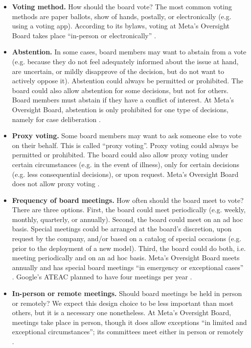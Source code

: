 \documentclass{article}
\begin{document}
\begin{itemize}[leftmargin=2em]
    \item \textbf{Voting method.} How should the board vote? The most common voting methods are paper ballots, show of hands, postally, or electronically (e.g. using a voting app). According to its bylaws, voting at Meta’s Oversight Board takes place “in-person or electronically” \cite{oversight2022bylaws}.
    \item \textbf{Abstention.} In some cases, board members may want to abstain from a vote (e.g. because they do not feel adequately informed about the issue at hand, are uncertain, or mildly disapprove of the decision, but do not want to actively oppose it). Abstention could always be permitted or prohibited. The board could also allow abstention for some decisions, but not for others. Board members must abstain if they have a conflict of interest. At Meta’s Oversight Board, abstention is only prohibited for one type of decisions, namely for case deliberation \cite{oversight2022bylaws}.
    \item \textbf{Proxy voting.} Some board members may want to ask someone else to vote on their behalf. This is called “proxy voting”. Proxy voting could always be permitted or prohibited. The board could also allow proxy voting under certain circumstances (e.g. in the event of illness), only for certain decisions (e.g. less consequential decisions), or upon request. Meta’s Oversight Board does not allow proxy voting \cite{oversight2022bylaws}.
    \item \textbf{Frequency of board meetings.} How often should the board meet to vote? There are three options. First, the board could meet periodically (e.g. weekly, monthly, quarterly, or annually). Second, the board could meet on an ad hoc basis. Special meetings could be arranged at the board’s discretion, upon request by the company, and/or based on a catalog of special occasions (e.g. prior to the deployment of a new model). Third, the board could do both, i.e. meeting periodically and on an ad hoc basis. Meta’s Oversight Board meets annually and has special board meetings “in emergency or exceptional cases” \cite{oversight2022bylaws}. Google’s ATEAC planned to have four meetings per year \cite{walker2019external}.
    \item \textbf{In-person or remote meetings.} Should board meetings be held in person or remotely? We expect this design choice to be less important than most others, but it is a necessary one nonetheless. At Meta’s Oversight Board, meetings take place in person, though it does allow exceptions “in limited and exceptional circumstances”; its committees meet either in person or remotely \cite{oversight2022bylaws}.

\end{itemize}
\end{document}
